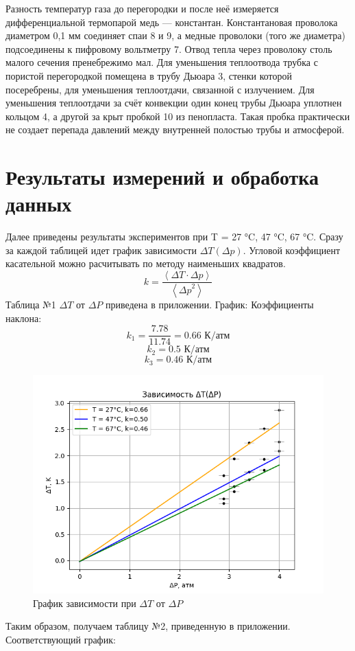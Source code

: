 \documentclass[a4paper, 10pt, twocolumn]{article}
\begin{document}
    Разность температур газа до перегородки и после неё измеряется дифференциальной термопарой медь 
    — константан. Константановая проволока диаметром 0,1 мм соединяет спаи 8 и 9, а медные 
    проволоки (того же диаметра) подсоединены к пифровому вольтметру 7. Отвод тепла через проволоку 
    столь малого сечения пренебрежимо мал. Для уменьшения теплоотвода трубка с пористой 
    перегородкой помещена в трубу Дьюара 3, стенки которой посеребрены, для уменьшения теплоотдачи, 
    связанной с излучением. Для уменьшения теплоотдачи за счёт конвекции один конец трубы Дьюара 
    уплотнен кольцом 4, а другой за крыт пробкой 10 из пенопласта. Такая пробка практически не 
    создает перепада давлений между внутренней полостью трубы и атмосферой.

\section{Результаты измерений и обработка данных}
    Далее приведены результаты экспериментов при T = 27 °C, 47 °C, 67 °C.
    Сразу за каждой таблицей идет график зависимости $\Delta T(\Delta p)$. \newline
    Угловой коэффициент касательной можно расчитывать по методу наименьших квадратов.
    $$k = \frac{\left\langle \Delta T \cdot \Delta p \right\rangle}
    {\left\langle {\Delta p}^2 \right\rangle}$$
    Таблица №1 $\Delta T \text{~от~} \Delta P$ приведена в приложении. \newline
    График: 
    Коэффициенты наклона:
        $$ k_1 = \frac{7.78}{11.74} = 0.66 \text{ К/атм} $$
        $$ k_2 = 0.5 \text{ К/атм} $$
        $$ k_3 = 0.46 \text{ К/атм} $$

    \begin{figure}[H]
        \centering
        \includegraphics[width=1\linewidth]{graphs/figure1.png}
        \begin{center}
            \caption{График зависимости при $\Delta T \text{~от~} \Delta P$}
        \end{center}
    \end{figure}
    Таким образом, получаем таблицу №2, приведенную в приложении. \newline
    Соответствующий график:
\end{document}
